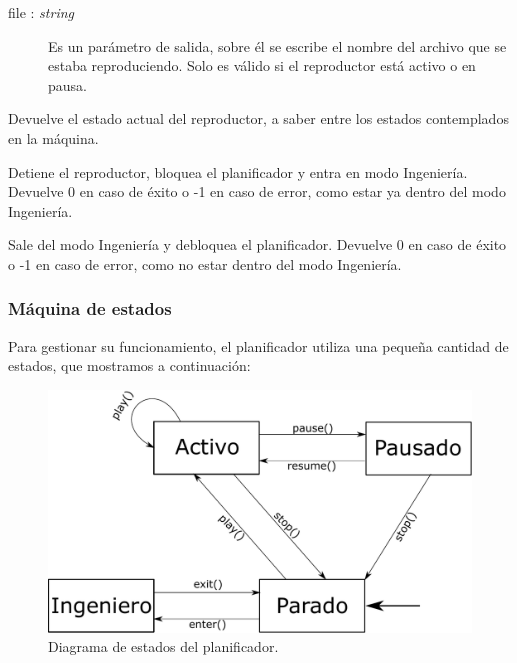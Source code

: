 \begin{description}[style=nextline]
	\begin{description}
		\item[file : \textit{string}] Es un parámetro de salida, sobre él se escribe el nombre del archivo que se estaba reproduciendo. Solo es válido si el reproductor está activo o en pausa.
	\end{description}
	
	Devuelve el estado actual del reproductor, a saber entre los estados contemplados en la máquina.
	
	\item[player\_engineer\_enter () : \textit{integer}]
	Detiene el reproductor, bloquea el planificador y entra en modo Ingeniería. Devuelve 0 en caso de éxito o -1 en caso de error, como estar ya dentro del modo Ingeniería.
	
	\item[player\_engineer\_exit () : \textit{integer}]
	Sale del modo Ingeniería y debloquea el planificador. Devuelve 0 en caso de éxito o -1 en caso de error, como no estar dentro del modo Ingeniería.
	
\end{description}

\subsubsection{Máquina de estados}

Para gestionar su funcionamiento, el planificador utiliza una pequeña cantidad de estados, que mostramos a continuación:

\smallskip

\begin{figure}[H]
	\noindent \begin{centering}
		\includegraphics[width=\linewidth/2]{capitulo4/sched}
		\par\end{centering}
	\smallskip
	\caption{\label{fig:sched} Diagrama de estados del planificador.}
\end{figure} 

